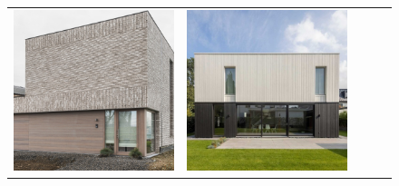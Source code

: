 \begin{figure}[H]
{\begin{tabular}{@{}ccccc@{}}
      \includegraphics[width=\linewidth]{Images/LoRAs/Geleding/9.jpg} &
      \includegraphics[width=\linewidth]{Images/LoRAs/Geleding/11.jpg} &

\end{tabular}}
\end{figure}
